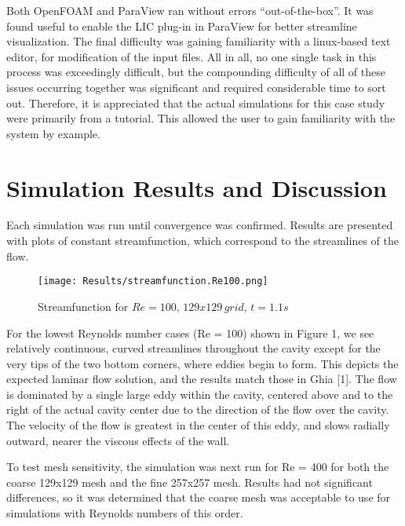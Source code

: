 \documentclass[twocolumn,10pt]{asme2ej}
\begin{document}
Both OpenFOAM and ParaView ran without errors “out-of-the-box”.  It was found useful to enable the LIC plug-in in ParaView for better streamline visualization.  The final difficulty was gaining familiarity with a linux-based text editor, for modification of the input files.  All in all, no one single task in this process was exceedingly difficult, but the compounding difficulty of all of these issues occurring together was significant and required considerable time to sort out.  Therefore, it is appreciated that the actual simulations for this case study were primarily from a tutorial.  This allowed the user to gain familiarity with the system by example.

\section{Simulation Results and Discussion}

Each simulation was run until convergence was confirmed.  Results are presented with plots of constant streamfunction, which correspond to the streamlines of the flow.

\vspace{-2em}
\begin{figure}[htb]
\begin{center}
\texttt{[image: Results/streamfunction.Re100.png]}
\caption{Streamfunction for $Re = 100,\, 129x129\, grid ,\, t = 1.1s$}
\end{center}
\end{figure}
\vspace{-2em}

For the lowest Reynolds number cases (Re = 100) shown in Figure 1, we see relatively continuous, curved streamlines throughout the cavity except for the very tips of the two bottom corners, where eddies begin to form.  This depicts the expected laminar flow solution, and the results match those in Ghia [1].  The flow is dominated by a single large eddy within the cavity, centered above and to the right of the actual cavity center due to the direction of the flow over the cavity.  The velocity of the flow is greatest in the center of this eddy, and slows radially outward, nearer the viscous effects of the wall.

To test mesh sensitivity, the simulation was next run for Re = 400 for both the coarse 129x129 mesh and the fine 257x257 mesh.  Results had not significant differences, so it was determined that the coarse mesh was acceptable to use for simulations with Reynolds numbers of this order.
\end{document}
